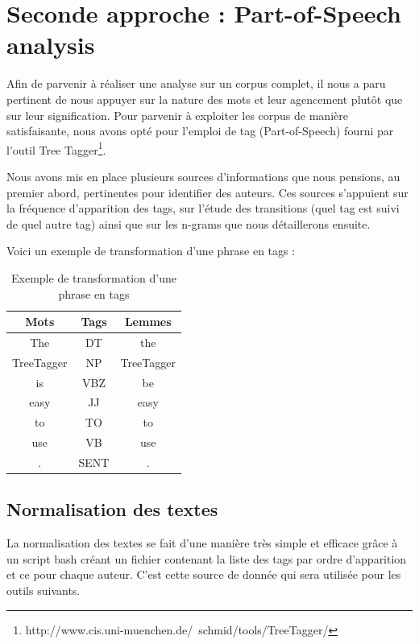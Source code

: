 \documentclass[a4paper,12pt]{report}
\begin{document}
\section{Seconde approche : Part-of-Speech analysis}

Afin de parvenir à réaliser une analyse sur un corpus complet, il nous a paru pertinent de nous appuyer sur la nature des mots et leur agencement plutôt que sur leur signification. Pour parvenir à exploiter les corpus de manière satisfaisante, nous avons opté pour l'emploi de tag (Part-of-Speech) fourni par l'outil Tree Tagger\footnote{http://www.cis.uni-muenchen.de/~schmid/tools/TreeTagger/}.

Nous avons mis en place plusieurs sources d'informations que nous pensions, au premier abord, pertinentes pour identifier des auteurs. Ces sources s'appuient sur la fréquence d'apparition des tags, sur l'étude des transitions (quel tag est suivi de quel autre tag) ainsi que sur les n-grams que nous détaillerons ensuite.

Voici un exemple de transformation d'une phrase en tags : 

\begin{table}[hbtp]
	\centering
		\begin{tabular}{|*{3}{c|}}
			\hline
			\textbf{Mots} & \textbf{Tags} & \textbf{Lemmes}\\
			\hline
			The & DT & the \\
			\hline
			TreeTagger & NP  & TreeTagger \\
			\hline
			is & VBZ  & be \\
			\hline
			easy & JJ & easy \\
			\hline
			 to & TO & to \\
			\hline
			use  & VB  & use \\
			\hline
			. & SENT & . \\
			\hline
		\end{tabular}
	\caption{Exemple de transformation d'une phrase en tags}
	\label{fig:TableauTag}
\end{table}


\subsection{Normalisation des textes}

La normalisation des textes se fait d'une manière très simple et efficace grâce à un script bash créant un fichier contenant la liste des tags par ordre d'apparition et ce pour chaque auteur. C'est cette source de donnée qui sera utilisée pour les outils suivants. 
\end{document}
